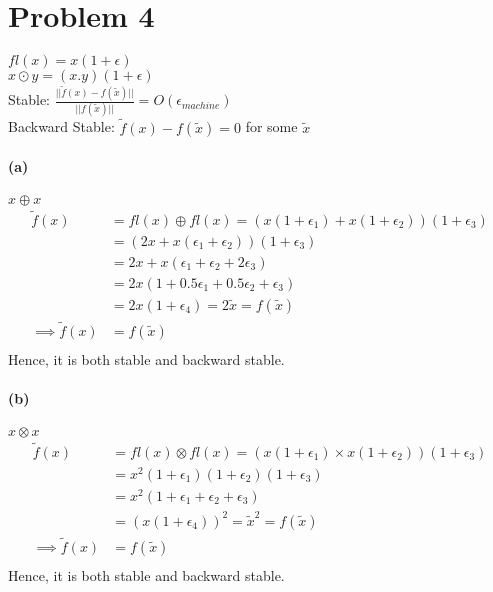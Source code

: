 \documentclass[12pt, letterpaper]{article}
\begin{document}
\pagebreak
\section*{Problem 4}

$fl(x) = x(1 + \epsilon)$\\
$ x \odot y = (x . y)(1 + \epsilon)$\\

Stable: $\frac{||\tilde{f}(x) - f(\tilde{x})||}{||f(\tilde{x})||} = O(\epsilon_{machine})$\\
Backward Stable: $\tilde{f}(x) - f(\tilde{x}) = 0$ for some $\tilde{x}$

\paragraph{(a)} $x \oplus x$\\

\begin{align*}
  \tilde{f}(x) &= fl(x) \oplus fl(x) = (x(1 + \epsilon_1) + x(1 + \epsilon_2))(1 + \epsilon_3)\\
  &= (2x + x(\epsilon_1 + \epsilon_2))(1 + \epsilon_3)\\
  &= 2x + x(\epsilon_1 + \epsilon_2 + 2\epsilon_3)\\
  &= 2x(1 + 0.5\epsilon_1 + 0.5\epsilon_2 + \epsilon_3)\\
  &= 2x(1 + \epsilon_4) = 2\tilde{x} = f(\tilde{x})\\
  \implies \tilde{f}(x) &= f(\tilde{x})\\
\end{align*}
Hence, it is both stable and backward stable.

\paragraph{(b)} $x \otimes x$\\

\begin{align*}
  \tilde{f}(x) &= fl(x) \otimes fl(x) = (x(1 + \epsilon_1) \times x(1 + \epsilon_2))(1 + \epsilon_3)\\
  &= x^2(1 + \epsilon_1)(1 + \epsilon_2)(1 + \epsilon_3)\\
  &= x^2(1 + \epsilon_1 + \epsilon_2 + \epsilon_3)\\
  &= (x(1 + \epsilon_4))^2 = \tilde{x}^2 = f(\tilde{x})\\
  \implies \tilde{f}(x) &= f(\tilde{x})\\
\end{align*}
Hence, it is both stable and backward stable.
\end{document}
